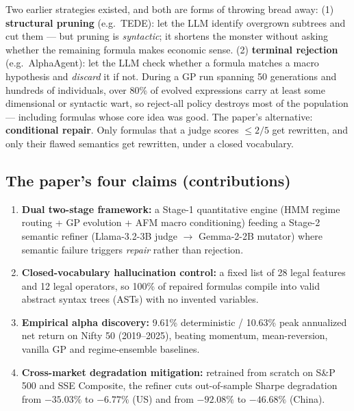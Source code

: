 \documentclass[11pt,a4paper]{article}
\begin{document}
\begin{plaineng}
Two earlier strategies existed, and both are forms of throwing bread away:
(1) \textbf{structural pruning} (e.g.\ TEDE): let the LLM identify overgrown
subtrees and cut them --- but pruning is \emph{syntactic}; it shortens the
monster without asking whether the remaining formula makes economic sense.
(2) \textbf{terminal rejection} (e.g.\ AlphaAgent): let the LLM check whether a
formula matches a macro hypothesis and \emph{discard} it if not. During a GP
run spanning 50 generations and hundreds of individuals, over 80\% of evolved
expressions carry at least some dimensional or syntactic wart, so reject-all
policy destroys most of the population --- including formulas whose core idea
was good. The paper's alternative: \textbf{conditional repair}. Only formulas
that a judge scores $\le 2/5$ get rewritten, and only their flawed semantics
get rewritten, under a closed vocabulary.
\end{plaineng}

\subsection{The paper's four claims (contributions)}

\begin{enumerate}
  \item \textbf{Dual two-stage framework:} a Stage-1 quantitative engine (HMM
  regime routing + GP evolution + AFM macro conditioning) feeding a Stage-2
  semantic refiner (Llama-3.2-3B judge $\rightarrow$ Gemma-2-2B mutator) where
  semantic failure triggers \emph{repair} rather than rejection.
  \item \textbf{Closed-vocabulary hallucination control:} a fixed list of 28
  legal features and 12 legal operators, so 100\% of repaired formulas compile
  into valid abstract syntax trees (ASTs) with no invented variables.
  \item \textbf{Empirical alpha discovery:} 9.61\% deterministic / 10.63\% peak
  annualized net return on Nifty 50 (2019--2025), beating momentum,
  mean-reversion, vanilla GP and regime-ensemble baselines.
  \item \textbf{Cross-market degradation mitigation:} retrained from scratch on
  S\&P 500 and SSE Composite, the refiner cuts out-of-sample Sharpe degradation
  from $-35.03\%$ to $-6.77\%$ (US) and from $-92.08\%$ to $-46.68\%$ (China).
\end{enumerate}

\end{document}
